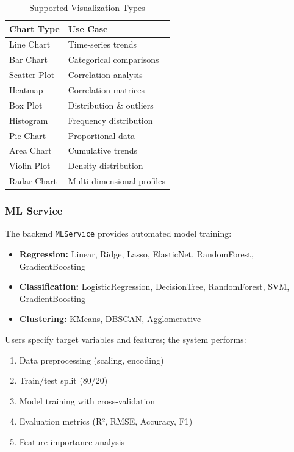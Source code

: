 \documentclass[conference]{IEEEtran}
\begin{document}
\begin{table}[htbp]
\caption{Supported Visualization Types}
\begin{center}
\begin{tabularx}{\linewidth}{|l|X|}
\hline
\textbf{Chart Type} & \textbf{Use Case} \\
\hline
Line Chart & Time-series trends \\
Bar Chart & Categorical comparisons \\
Scatter Plot & Correlation analysis \\
Heatmap & Correlation matrices \\
Box Plot & Distribution \& outliers \\
Histogram & Frequency distribution \\
Pie Chart & Proportional data \\
Area Chart & Cumulative trends \\
Violin Plot & Density distribution \\
Radar Chart & Multi-dimensional profiles \\
\hline
\end{tabularx}
\label{tab:charts}
\end{center}
\end{table}

\subsubsection{ML Service}

The backend \texttt{MLService} provides automated model training:

\begin{itemize}
    \item \textbf{Regression:} Linear, Ridge, Lasso, ElasticNet, RandomForest, GradientBoosting
    \item \textbf{Classification:} LogisticRegression, DecisionTree, RandomForest, SVM, GradientBoosting
    \item \textbf{Clustering:} KMeans, DBSCAN, Agglomerative
\end{itemize}

Users specify target variables and features; the system performs:
\begin{enumerate}
    \item Data preprocessing (scaling, encoding)
    \item Train/test split (80/20)
    \item Model training with cross-validation
    \item Evaluation metrics (R², RMSE, Accuracy, F1)
    \item Feature importance analysis
\end{enumerate}
\end{document}

